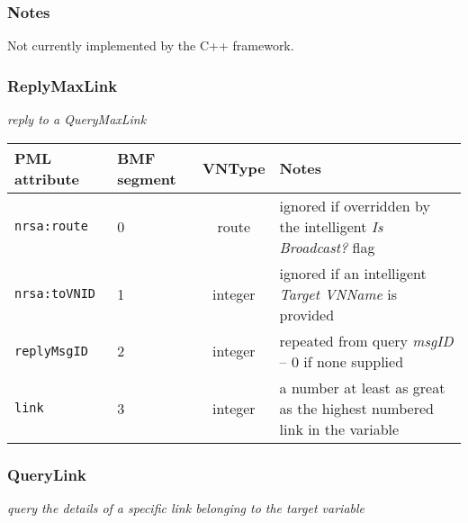 \documentclass[pdftex,a4paper]{article}
\newcommand{\XMLfont}[1]{{\tt \small #1}}
\begin{document}
\subsubsection*{Notes}
Not currently implemented by the C++ framework.

\subsubsection{ReplyMaxLink}

{\em reply to a QueryMaxLink}

\begin{table}[!h]
  \begin{center}
    \label{tab:ReplyMaxLink}
    \begin{tabular}{|l|p{13mm}|c|p{60mm}|}
      \hline

      \textbf{PML attribute} & \textbf{BMF segment} & \textbf{VNType}
      & \textbf{Notes} \\\hline

      \XMLfont{nrsa:route} & 0 & route & ignored if overridden by the
      intelligent {\em Is Broadcast?} flag \\ \hline

      \XMLfont{nrsa:toVNID} & 1 & integer & ignored if an intelligent {\em
      Target VNName} is provided \\\hline

      \XMLfont{replyMsgID} & 2 & integer & repeated from query {\em
      msgID} -- 0 if none supplied \\\hline

      \XMLfont{link} & 3 & integer & a number at least as great
      as the highest numbered link in the variable \\\hline

    \end{tabular}
  \end{center}
\end{table}

\clearpage

\subsubsection{QueryLink}

{\em query the details of a specific link belonging to the target
variable}
\end{document}
